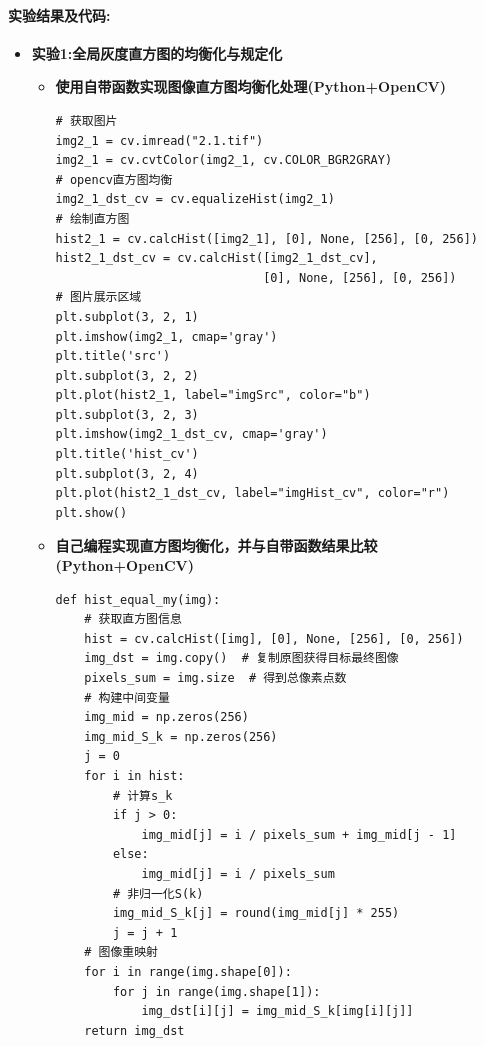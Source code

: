 \documentclass{ctexart}
\begin{document}
\paragraph{实验结果及代码:} 
\begin{itemize}
\item \textbf{实验1:全局灰度直方图的均衡化与规定化}
\begin{itemize}
\item \textbf{使用自带函数实现图像直方图均衡化处理(Python+OpenCV)}
\begin{lstlisting}
# 获取图片
img2_1 = cv.imread("2.1.tif")
img2_1 = cv.cvtColor(img2_1, cv.COLOR_BGR2GRAY)
# opencv直方图均衡
img2_1_dst_cv = cv.equalizeHist(img2_1)
# 绘制直方图
hist2_1 = cv.calcHist([img2_1], [0], None, [256], [0, 256])
hist2_1_dst_cv = cv.calcHist([img2_1_dst_cv], 
                             [0], None, [256], [0, 256])
# 图片展示区域
plt.subplot(3, 2, 1)
plt.imshow(img2_1, cmap='gray')
plt.title('src')
plt.subplot(3, 2, 2)
plt.plot(hist2_1, label="imgSrc", color="b")
plt.subplot(3, 2, 3)
plt.imshow(img2_1_dst_cv, cmap='gray')
plt.title('hist_cv')
plt.subplot(3, 2, 4)
plt.plot(hist2_1_dst_cv, label="imgHist_cv", color="r")
plt.show()
\end{lstlisting}

\item \textbf{自己编程实现直方图均衡化，并与自带函数结果比较(Python+OpenCV)}
\begin{lstlisting}
def hist_equal_my(img):
    # 获取直方图信息
    hist = cv.calcHist([img], [0], None, [256], [0, 256])
    img_dst = img.copy()  # 复制原图获得目标最终图像
    pixels_sum = img.size  # 得到总像素点数
    # 构建中间变量
    img_mid = np.zeros(256)
    img_mid_S_k = np.zeros(256)
    j = 0
    for i in hist:
        # 计算s_k
        if j > 0:
            img_mid[j] = i / pixels_sum + img_mid[j - 1]
        else:
            img_mid[j] = i / pixels_sum
        # 非归一化S(k)
        img_mid_S_k[j] = round(img_mid[j] * 255)
        j = j + 1
    # 图像重映射
    for i in range(img.shape[0]):
        for j in range(img.shape[1]):
            img_dst[i][j] = img_mid_S_k[img[i][j]]
    return img_dst


\end{lstlisting}
\end{itemize}
\end{itemize}
\end{document}
